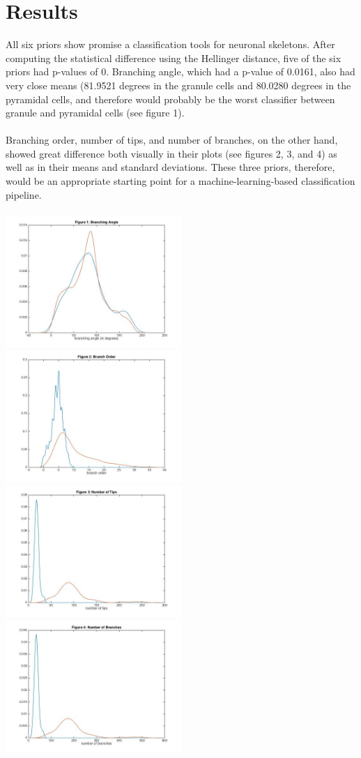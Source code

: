 \documentclass[11pt]{article} %
\begin{document}
\section{Results}
	All six priors show promise a classification tools for neuronal skeletons. After computing the statistical difference using the Hellinger distance, five of the six priors had p-values of 0. Branching angle, which had a p-value of 0.0161, also had very close means (81.9521 degrees in the granule cells and 80.0280 degrees in the pyramidal cells, and therefore would probably be the worst classifier between granule and pyramidal cells (see figure 1).\\
\\
	Branching order, number of tips, and number of branches, on the other hand, showed great difference both visually in their plots (see figures 2, 3, and 4) as well as in their means and standard deviations. These three priors, therefore, would be an appropriate starting point for a machine-learning-based classification pipeline.\\
\\
\includegraphics[width=0.5\textwidth]{Figure_1.jpg}
\includegraphics[width=0.5\textwidth]{Figure_2.jpg}
\includegraphics[width=0.5\textwidth]{Figure_3.jpg}
\includegraphics[width=0.5\textwidth]{Figure_4.jpg}
\end{document}
